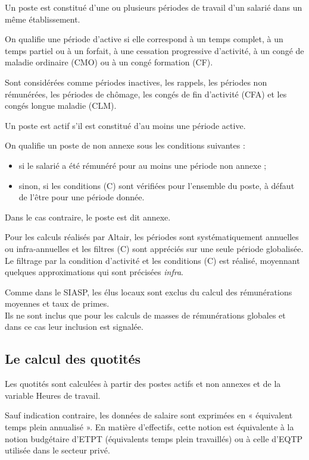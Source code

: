 \documentclass[]{article}
\begin{document}
Un poste est constitué d'une ou plusieurs périodes de travail d'un
salarié dans un même établissement.

On qualifie une période d'active si elle correspond à un temps complet,
à un temps partiel ou à un forfait, à une cessation progressive
d'activité, à un congé de maladie ordinaire (CMO) ou à un congé
formation (CF).

Sont considérées comme périodes inactives, les rappels, les périodes non
rémunérées, les périodes de chômage, les congés de fin d'activité (CFA)
et les congés longue maladie (CLM).

Un poste est actif s'il est constitué d'au moins une période active.

On qualifie un poste de non annexe sous les conditions suivantes :

\begin{itemize}
\itemsep1pt\parskip0pt
\item
  si le salarié a été rémunéré pour au moins une période non annexe ;\\
\item
  sinon, si les conditions (C) sont vérifiées pour l'ensemble du poste,
  à défaut de l'être pour une période donnée.
\end{itemize}

Dans le cas contraire, le poste est dit annexe.

Pour les calculs réalisés par Altair, les périodes sont systématiquement
annuelles ou infra-annuelles et les filtres (C) sont appréciés sur une
seule période globalisée. Le filtrage par la condition d'activité et les
conditions (C) est réalisé, moyennant quelques approximations qui sont
précisées \emph{infra}.

Comme dans le SIASP, les élus locaux sont exclus du calcul des
rémunérations moyennes et taux de primes.\\Ils ne sont inclus que pour
les calculs de masses de rémunérations globales et dans ce cas leur
inclusion est signalée.

\subsection{Le calcul des quotités}\label{le-calcul-des-quotites}

Les quotités sont calculées à partir des postes actifs et non annexes et
de la variable Heures de travail.

Sauf indication contraire, les données de salaire sont exprimées en «
équivalent temps plein annualisé ». En matière d'effectifs, cette notion
est équivalente à la notion budgétaire d'ETPT (équivalents temps plein
travaillés) ou à celle d'EQTP utilisée dans le secteur privé.
\end{document}
